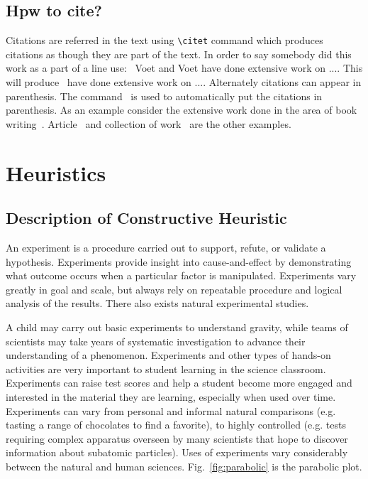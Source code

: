 \documentclass[11pt, a4paper]{article}
\begin{document}
\subsection{Hpw to cite?}
Citations are referred in the text using \verb|\citet| command which produces citations
as though they are part of the text. In order to say somebody did this work as a part of a line use:~ Voet and Voet have done extensive work on .... This will produce~\citet{voet2011biochemistry} have done extensive work on .... Alternately citations can appear in parenthesis. The command~\citep{voet2011biochemistry} is used to automatically put the citations in parenthesis. As an example consider the extensive work done in the area of book writing~\citep{seifert1991shape}.
Article~\citep{sircar1972adsorption,keh1995particle} and collection of work~\citep{seifert1995morphology} are the other examples.

\section{Heuristics}\label{sec:exp}

\subsection{Description of Constructive Heuristic}
An experiment is a procedure carried out to support, refute, or validate a hypothesis. Experiments provide insight into cause-and-effect by demonstrating what outcome occurs when a particular factor is manipulated. Experiments vary greatly in goal and scale, but always rely on repeatable procedure and logical analysis of the results. There also exists natural experimental studies.

A child may carry out basic experiments to understand gravity, while teams of scientists may take years of systematic investigation to advance their understanding of a phenomenon. Experiments and other types of hands-on activities are very important to student learning in the science classroom. Experiments can raise test scores and help a student become more engaged and interested in the material they are learning, especially when used over time. Experiments can vary from personal and informal natural comparisons (e.g. tasting a range of chocolates to find a favorite), to highly controlled (e.g. tests requiring complex apparatus overseen by many scientists that hope to discover information about subatomic particles). Uses of experiments vary considerably between the natural and human sciences. Fig.~\ref{fig:parabolic} is the parabolic plot.
\end{document}
